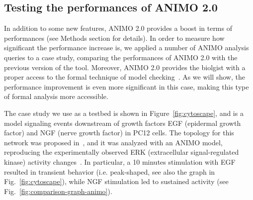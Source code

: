 \documentclass{bmcart}
\begin{document}
\subsection*{Testing the performances of ANIMO 2.0}\label{subsec:model-checking}
In addition to some new features, ANIMO 2.0 provides a boost in terms of performances
(see Methods section for details).
In order to measure how significant the performance increase is, we applied a number of
ANIMO analysis queries to a case study, comparing the performances of ANIMO 2.0 with
the previous version of the tool. Moreover, ANIMO 2.0 provides the biolgist with
a proper access to the formal technique of model checking~\cite{model-checking}. As we will show, the
performance improvement is even more significant in this case, making this type of formal
analysis more accessible.

The case study we use as a testbed is shown in Figure~\ref{fig:cytoscape},
and is a model signaling events downstream of growth factors EGF (epidermal growth factor)
and NGF (nerve growth factor) in PC12 cells.
The topology for this network was proposed in~\cite{egf-ngf}, and it was analyzed
with an ANIMO model, reproducing the experimentally 
observed ERK (extracellular signal-regulated kinase) activity changes~\cite{animo-bibe}.
In particular, a 10 minutes stimulation with EGF resulted in transient behavior (i.e. peak-shaped,
see also the graph in Fig.~\ref{fig:cytoscape}), while NGF stimulation led to sustained activity (see Fig.~\ref{fig:comparison-graph-animo}).
\end{document}
